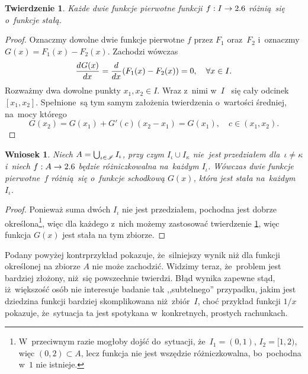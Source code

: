 \documentclass[a4paper,11pt]{article}
\newtheorem{twr}{Twierdzenie}  %
\newtheorem{wni}{Wniosek}
\begin{document}
\begin{twr}
  \label{thm:FichtenholzVolII-01}
  Każde dwie funkcje pierwotne funkcji $f: I \to 2.6$ różnią~się
  o~funkcje stałą.
\end{twr}
\begin{proof}
  Oznaczmy dowolne dwie funkcje pierwotne $f$ przez $F_{ 1 }$
  oraz~$F_{ 2 }$ i~oznaczmy $G( x ) = F_{ 1 }( x ) - F_{ 2 }( x )$.
  Zachodzi wówczas
  \begin{equation}
    \label{eq:FichtenholzVolII-06}
    \frac{ d^{   } {  G( x )  } }{ d {  x  }^{   } } = \frac{ d^{   } {   } }{ d {  x  }^{   } } ( F_{ 1 }( x ) - F_{ 2 }( x ) )
    = 0,
    \quad \forall x \in I.
  \end{equation}
  Rozważmy dwa dowolne punkty $x_{ 1 }, x_{ 2 } \in I$. Wraz z~nimi
  w~$I$ ~się cały odcinek $[ x_{ 1 }, x_{ 2 } ]$. Spełnione~są tym
  samym założenia twierdzenia o~wartości średniej, na~mocy którego
  \begin{equation}
    \label{eq:FichtenholzVolII-07}
    G( x_{ 2 } ) = G( x_{ 1 } ) + G'( c ) ( x_{ 2 } - x_{ 1 } ) = G( x_{ 1 } ),
    \quad c \in ( x_{ 1 }, x_{ 2 } ).
  \end{equation}
\end{proof}
\begin{wni}
  \label{cor:FichtenholzVolII-01}
  Niech $A = \bigcup_{ \iota \in \mathcal{I} } I_{ \iota }$, przy czym
  $I_{ \iota } \cup I_{ \kappa }$ nie~jest przedziałem
  dla~$\iota \neq \kappa$ i~niech $f: A \to 2.6$ będzie różniczkowalna
  na~każdym $I_{ \iota }$. Wówczas dwie funkcje pierwotne~$f$
  różnią~się o~funkcje schodkową $G( x )$, która jest stała na~każdym
  $I_{ \iota }$.
\end{wni}
\begin{proof}
  Ponieważ suma dwóch $I_{ \iota }$ nie jest przedziałem, pochodna
  jest dobrze określona\footnote{W~przeciwnym razie mogłoby dojść
    do~sytuacji, że~$I_{ 1 } = (0, 1)$, $I_{ 2 } = [ 1, 2 )$, więc
    $( 0, 2 ) \subset A$, lecz funkcja nie jest wszędzie
    różniczkowalna, bo~pochodna w~$1$ nie istnieje.}, więc dla każdego
  z~nich możemy zastosować twierdzenie \ref{thm:FichtenholzVolII-01},
  więc funkcja $G( x )$ jest stała na tym zbiorze.
\end{proof}

Podany powyżej kontrprzykład pokazuje, że~silniejszy wynik niż dla
funkcji określonej na zbiorze $A$ nie może zachodzić. Widzimy teraz,
że~problem jest bardziej złożony, niż~się powszechnie twierdzi. Błąd
wynika zapewne stąd, iż~większość osób nie interesuje badanie tak
,,subtelnego'' przypadku, jakim jest dziedzina funkcji bardziej
skomplikowana niż~zbiór~$I$, choć przykład funkcji $1 / x$ pokazuje,
że~sytuacja ta jest spotykana w~konkretnych, prostych rachunkach.
\end{document}
